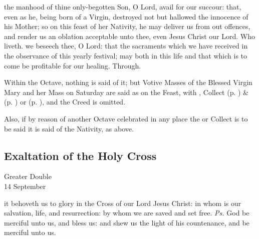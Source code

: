 \clearpage
{}
\secret
{} the manhood of thine only-begotten Son, O Lord, avail for our succour: that, even as he, being born of a Virgin, destroyed not but hallowed the innocence of his Mother; so on this feast of her Nativity, he may deliver us from out offences, and render us an oblation acceptable unto thee, even Jesus Christ our Lord. Who liveth.
\postcommunion
{} we beseech thee, O Lord: that the sacraments which we have received in the observance of this yearly festival; may both in this life and that which is to come be profitable for our healing. Through.

\begin{rubric}
    Within the Octave, nothing is said of it; but Votive Masses of the Blessed Virgin Mary and her Mass on Saturday are said as on the Feast, with ,  Collect  (p. \pageref{SPHolyGhost}) \&   (p. \pageref{SPAgainst}) or  (p. \pageref{SPChiefBishop}), and the Creed is omitted.
\end{rubric}
\begin{rubric}
    Also, if by reason of another Octave celebrated in any place the  or  Collect is to be said  it is said of the Nativity, as above.
\end{rubric}


\subsection{Exaltation of the Holy Cross}
\begin{inhead}
	{Greater Double\\
		14 September}
\end{inhead}


\introit
{} it behoveth us to glory in the Cross of our Lord Jesus Christ: in whom is our salvation, life, and resurrection: by whom we are saved and set free. \textit{Ps.} God be merciful unto us, and bless us: and shew us the light of his countenance, and be merciful unto us.


